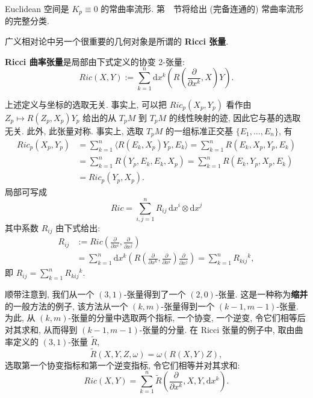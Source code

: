 \begin{RiemannExample}\label{ex:euclidean-space-of-zero-constant-curvature}
Euclidean 空间是 $K_p\equiv0$ 的常曲率流形. 第~~节将给出 (完备连通的) 常曲率流形的完整分类.
\end{RiemannExample}

广义相对论中另一个很重要的几何对象是所谓的 \textbf{Ricci 张量}.

\begin{RiemannDefinition}\label{def:ricci-curvature-tensor}
\textbf{Ricci 曲率张量}是局部由下式定义的协变 2-张量:
\[
  \mathit{Ric}(X,Y):=\sum_{k=1}^n\mathrm{d}x^k
  \left(R\left(\frac{\partial}{\partial x^k},X\right)Y\right).
\]
\end{RiemannDefinition}

上述定义与坐标的选取无关. 事实上, 可以把 $\mathit{Ric}_p(X_p,Y_p)$ 看作由 $Z_p\mapsto R(Z_p,X_p)Y_p$ 给出的从 $T_pM$ 到 $T_pM$ 的线性映射的迹, 因此它与基的选取无关. 此外, 此张量对称. 事实上, 选取 $T_pM$ 的一组标准正交基 $\{E_1,\ldots,E_n\}$, 有
\begin{align*}
  \mathit{Ric}_p(X_p,Y_p)
  &=\sum_{k=1}^n\bigl\langle R(E_k,X_p)Y_p,E_k\bigr\rangle
    =\sum_{k=1}^nR(E_k,X_p,Y_p,E_k)\\
  &=\sum_{k=1}^n R(Y_p,E_k,E_k,X_p)=\sum_{k=1}^nR(E_k,Y_p,X_p,E_k)\\
  &=\mathit{Ric}_p(Y_p,X_p).
\end{align*}
局部可写成
\[
  \mathit{Ric}=\sum_{i,j=1}^nR_{ij}\,\mathrm{d}x^i\otimes\mathrm{d}x^j
\]
其中系数 $R_{ij}$ 由下式给出:
\begin{align*}
  R_{ij}&:=\mathit{Ric}\left(\frac{\partial}{\partial x^i},\frac{\partial}{\partial x^j}\right)\\
  &=\sum_{k=1}^n\mathrm{d}x^k\left(R\left(\frac{\partial}{\partial x^k},
    \frac{\partial}{\partial x^i}\right)\frac{\partial}{\partial x^j}\right)
    =\sum_{k=1}^n R_{kij}{}^k,
\end{align*}
即 $R_{ij}=\sum_{k=1}^nR_{kij}{}^k$.

顺带注意到, 我们从一个 $(3,1)$-张量得到了一个 $(2,0)$-张量. 这是一种称为\textbf{缩并}的一般方法的例子, 该方法从一个 $(k,m)$-张量得到一个 $(k-1,m-1)$-张量. 为此, 从 $(k,m)$-张量的分量中选取两个指标, 一个协变, 一个逆变, 令它们相等后对其求和, 从而得到 $(k-1,m-1)$-张量的分量. 在 Ricci 张量的例子中, 取由曲率定义的 $(3,1)$-张量 $\widetilde R$,
\[
  \widetilde R(X,Y,Z,\omega)=\omega(R(X,Y)Z),
\]
选取第一个协变指标和第一个逆变指标, 令它们相等并对其求和:
\[
  \mathit{Ric}(X,Y)=\sum_{k=1}^n\widetilde R
  \left(\frac{\partial}{\partial x^k},X,Y,\mathrm{d}x^k\right).
\]


